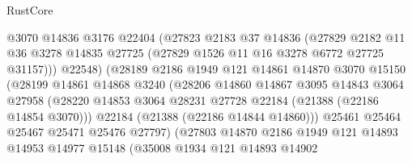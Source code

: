 \begin{lexlean}{RustCore}
\begin{coremodule}
                              @3070
                              @14836
                              @3176
                              @22404
                              (@27823
                                @2183
                                @37
                                @14836
                                (@27829
                                  @2182
                                  @11
                                  @36
                                  @3278
                                  @14835
                                  @27725
                                  (@27829 @1526 @11 @16 @3278 @6772 @27725 @31157)))
                              @22548)
                            (@28189
                              @2186
                              @1949
                              @121
                              @14861
                              @14870
                              @3070
                              @15150
                              (@28199
                                @14861
                                @14868
                                @3240
                                (@28206
                                  @14860
                                  @14867
                                  @3095
                                  @14843
                                  @3064
                                  @27958
                                  (@28220
                                    @14853
                                    @3064
                                    @28231
                                    @27728
                                    @22184
                                    (@21388 (@22186 @14854 @3070)))
                                  @22184
                                  (@21388 (@22186 @14844 @14860)))
                                @25461
                                @25464
                                @25467
                                @25471
                                @25476
                                @27797)
                              (@27803
                                @14870
                                @2186
                                @1949
                                @121
                                @14893
                                @14953
                                @14977
                                @15148
                                (@35008
                                  @1934
                                  @121
                                  @14893
                                  @14902

\end{coremodule}
\end{lexlean}
